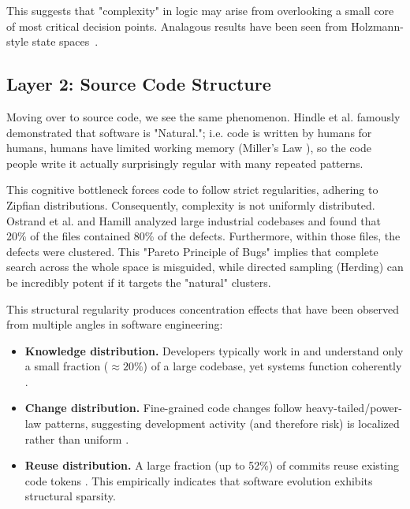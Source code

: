 \documentclass[pdflatex,sn-basic]{sn-jnl}
\begin{document}
This suggests 
that "complexity" in logic may arise
from overlooking a  small core of 
most critical decision points.   Analagous results
have been seen from Holzmann-style state spaces~\citep{pelanek2008properties}.

\subsection{Layer 2: Source Code Structure}
Moving over to source code, we see the same phenomenon. Hindle et al. 
\citep{Hindle12} famously demonstrated that software is "Natural."; i.e.  code is 
written by humans for humans,  humans have limited working memory 
(Miller's Law \citep{miller1956magical}),
so the code people write it actually
surprisingly regular with many repeated patterns.

This cognitive bottleneck forces code to follow strict regularities, adhering 
to Zipfian distributions. Consequently, complexity is not uniformly 
distributed. Ostrand et al. \citep{Ostrand04} and Hamill \citep{Hamill09} 
analyzed large industrial codebases and found that 20\% of the files 
contained 80\% of the defects. Furthermore, within those files, the 
defects were clustered. This "Pareto Principle of Bugs" implies that complete search across
the whole space
 is misguided, while directed sampling (Herding) can be incredibly 
potent if it targets the "natural" clusters.

This structural regularity produces concentration effects that have been observed
from multiple angles in software engineering:
\begin{itemize}
  \item \textbf{Knowledge distribution.} Developers typically work in and understand only
  a small fraction ($\approx 20\%$) of a large codebase, yet systems function coherently \citep{Peters15}.
  \item \textbf{Change distribution.} Fine-grained code changes follow heavy-tailed/power-law
  patterns, suggesting development activity (and therefore risk) is localized rather than uniform
  \citep{Lin15}.
  \item \textbf{Reuse distribution.} A large fraction (up to 52\%) of commits reuse existing code tokens \citep{martinez2014fix}. This empirically indicates that software evolution exhibits structural sparsity.
\end{itemize}
\end{document}
